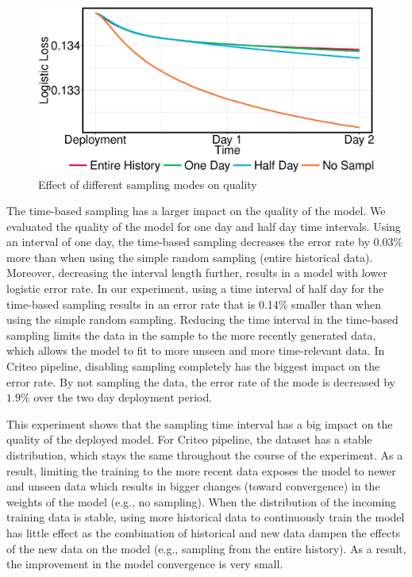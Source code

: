 \begin{figure}[h!]
\centering
\includegraphics[width=\columnwidth]{../images/experiment-results/criteo-sampling-mode-experiments.eps}
\caption{Effect of different sampling modes on quality}
\label{fig:sampling-mode-quality}
\vspace{2mm}
\end{figure}

The time-based sampling has a larger impact on the quality of the model.
We evaluated the quality of the model for one day and half day time intervals.
Using an interval of one day, the time-based sampling decreases the error rate by 0.03\%  more than when using the simple random sampling (entire historical data).
Moreover, decreasing the interval length further, results in a model with lower logistic error rate.
In our experiment, using a time interval of half day for the time-based sampling results in an error rate that is 0.14\% smaller than when using the simple random sampling. 
Reducing the time interval in the time-based sampling limits the data in the sample to the more recently generated data, which allows the model to fit to more unseen and more time-relevant data.
In Criteo pipeline, disabling sampling completely has the biggest impact on the error rate.
By not sampling the data, the error rate of the mode is decreased by $1.9\%$ over the two day deployment period.

This experiment shows that the sampling time interval has a big impact on the quality of the deployed model.
For Criteo pipeline, the dataset has a stable distribution, which stays the same throughout the course of the experiment.
As a result, limiting the training to the more recent data exposes the model to newer and unseen data which results in bigger changes (toward convergence) in the weights of the model (e.g., no sampling).
When the distribution of the incoming training data is stable, using more historical data to continuously train the model has little effect as the combination of historical and new data dampen the effects of the new data on the model (e.g., sampling from the entire history).
As a result, the improvement in the model convergence is very small.

